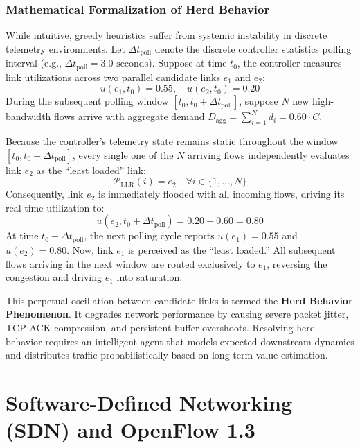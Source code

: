 \subsubsection{Mathematical Formalization of Herd Behavior}
While intuitive, greedy heuristics suffer from systemic instability in discrete telemetry environments. Let $\Delta t_{\text{poll}}$ denote the discrete controller statistics polling interval (e.g., $\Delta t_{\text{poll}} = 3.0\text{ seconds}$). Suppose at time $t_0$, the controller measures link utilizations across two parallel candidate links $e_1$ and $e_2$:
\begin{equation}
    u(e_1, t_0) = 0.55, \quad u(e_2, t_0) = 0.20
\end{equation}
During the subsequent polling window $[t_0, t_0 + \Delta t_{\text{poll}}]$, suppose $N$ new high-bandwidth flows arrive with aggregate demand $D_{\text{agg}} = \sum_{i=1}^N d_i = 0.60 \cdot C$.

Because the controller's telemetry state remains static throughout the window $[t_0, t_0 + \Delta t_{\text{poll}}]$, every single one of the $N$ arriving flows independently evaluates link $e_2$ as the ``least loaded'' link:
\begin{equation}
    \mathcal{P}_{\text{LLR}}(i) = e_2 \quad \forall i \in \{1, \dots, N\}
\end{equation}
Consequently, link $e_2$ is immediately flooded with all incoming flows, driving its real-time utilization to:
\begin{equation}
    u(e_2, t_0 + \Delta t_{\text{poll}}) = 0.20 + 0.60 = 0.80
\end{equation}
At time $t_0 + \Delta t_{\text{poll}}$, the next polling cycle reports $u(e_1) = 0.55$ and $u(e_2) = 0.80$. Now, link $e_1$ is perceived as the ``least loaded.'' All subsequent flows arriving in the next window are routed exclusively to $e_1$, reversing the congestion and driving $e_1$ into saturation.

This perpetual oscillation between candidate links is termed the \textbf{Herd Behavior Phenomenon}. It degrades network performance by causing severe packet jitter, TCP ACK compression, and persistent buffer overshoots. Resolving herd behavior requires an intelligent agent that models expected downstream dynamics and distributes traffic probabilistically based on long-term value estimation.

\section{Software-Defined Networking (SDN) and OpenFlow 1.3}

